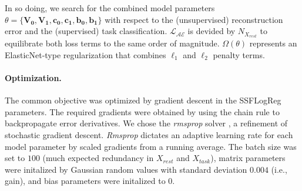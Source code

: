 \documentclass{article} %
\begin{document}
In so doing, we search for the combined model parameters
$\theta=\{\mathbf{V_0,V_1,c_0, c_1, b_0, b_1}\}$
with respect to the (unsupervised) reconstruction error and the
(supervised) task classification.
${\mathcal{L_{AE}}}$ is devided by ${N_{X_{rest}}}$ to equilibrate both
loss terms to the same order of magnitude.
\(\Omega(\theta)\) represents an ElasticNet-type regularization
that combines $\ell_1$ and $\ell_2$ penalty terms.


\paragraph{Optimization.}
The common objective was optimized
by gradient descent in the SSFLogReg parameters.
The required gradients were obtained by using the chain rule to
backpropagate error derivatives.
We chose the \textit{rmsprop} solver \cite{rmsprop},
a refinement of stochastic gradient descent.
\textit{Rmsprop} dictates an adaptive learning rate
for each model parameter by
scaled gradients from a running average.
The batch size was set to $100$
(much expected redundancy in $X_{rest}$ and $X_{task}$),
matrix parameters were initalized by Gaussian random values with
standard deviation $0.004$ (i.e., gain), and
bias parameters were initalized to $0$.
\end{document}
